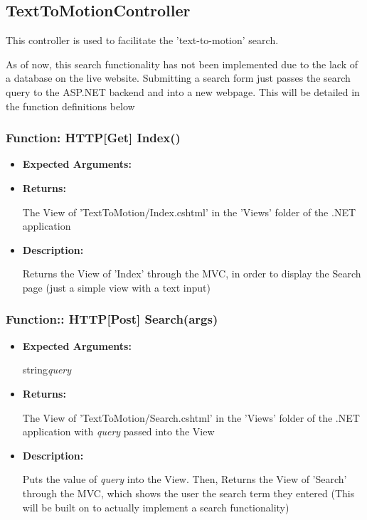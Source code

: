\documentclass{scrreprt}
\begin{document}
\subsection{TextToMotionController}

This controller is used to facilitate the 'text-to-motion' search.

As of now, this search functionality has not been implemented due to the lack
of a database on the live website. Submitting a search form just passes the
search query to the ASP.NET backend and into a new webpage. This will be
detailed in the function definitions below

\subsubsection{Function: HTTP[Get] Index()}

\begin{itemize}
        \item \textbf{Expected Arguments:}
        \item \textbf{Returns:}

                The View of 'TextToMotion/Index.cshtml' in the 'Views' folder
                of the .NET application

        \item \textbf{Description:}

                Returns the View of 'Index' through the MVC, in order to
                display the Search page (just a simple view with a text input)
\end{itemize}


\subsubsection{Function:: HTTP[Post] Search(args)}

\begin{itemize}
        \item \textbf{Expected Arguments:}

                string\quad\textit{query}

        \item \textbf{Returns:}

                The View of 'TextToMotion/Search.cshtml' in the 'Views' folder
                of the .NET application with \textit{query} passed into the
                View

        \item \textbf{Description:}

                Puts the value of \textit{query} into the View. Then, Returns
                the View of 'Search' through the MVC, which shows the user the
                search term they entered (This will be built on to actually
                implement a search functionality)

\end{itemize}
\end{document}

